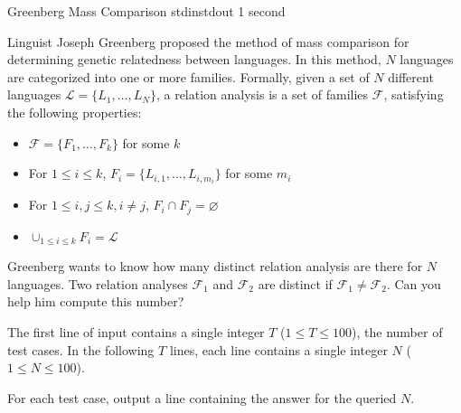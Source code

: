 \begin{problem}{Greenberg Mass Comparison}
{stdin}{stdout}
{1 second}{}{}

Linguist Joseph Greenberg proposed the method of mass comparison for determining genetic relatedness between languages. In this method, $N$ languages are categorized into one or more families. Formally, given a set of $N$ different languages $\mathcal{L} = \{L_1, \hdots, L_N\}$, a relation analysis is a set of families $\mathcal{F}$, satisfying the following properties: 
\begin{itemize}
\item $\mathcal{F} = \{F_1, \hdots, F_k\}$ for some $k$
\item For $1 \le i \le k$, $F_i = \{L_{i,1}, \hdots, L_{i,m_i}\}$ for some $m_i$
\item For $1 \le i,j \le k, i \ne j$, $F_i \cap F_j = \varnothing$
\item $\cup_{1 \le i \le k}{F_i} = \mathcal{L}$
\end{itemize}

Greenberg wants to know how many distinct relation analysis are there for $N$ languages. Two relation analyses $\mathcal{F}_1$ and $\mathcal{F}_2$ are distinct if $\mathcal{F}_1 \ne \mathcal{F}_2$. Can you help him compute this number? 

\InputFile

The first line of input contains a single integer $T$ ($1 \le T \le 100$), the number of test cases. 
In the following $T$ lines, each line contains a single integer $N$ ($1 \le N \le 100$). 

\OutputFile

For each test case, output a line containing the answer for the queried $N$. 

\Examples

\begin{example}
%
\end{example}

\end{problem}